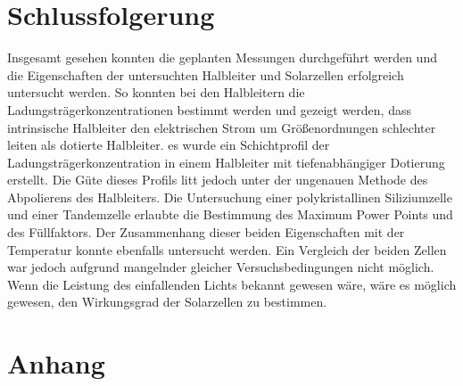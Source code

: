 \documentclass[
	a4paper,
	12pt,
	pagesize,
	ngerman
]{scrartcl}
\begin{document}
	\section{Schlussfolgerung}
	Insgesamt gesehen konnten die geplanten Messungen durchgeführt werden und die Eigenschaften der untersuchten Halbleiter und Solarzellen erfolgreich untersucht werden.
	So konnten bei den Halbleitern die Ladungsträgerkonzentrationen bestimmt werden und gezeigt werden, dass intrinsische Halbleiter den elektrischen Strom um Größenordnungen schlechter leiten als dotierte Halbleiter.
	es wurde ein Schichtprofil der Ladungsträgerkonzentration in einem Halbleiter mit tiefenabhängiger Dotierung erstellt.
	Die Güte dieses Profils litt jedoch unter der ungenauen Methode des Abpolierens des Halbleiters.
	Die Untersuchung einer polykristallinen Siliziumzelle und einer Tandemzelle erlaubte die Bestimmung des Maximum Power Points und des Füllfaktors.
	Der Zusammenhang dieser beiden Eigenschaften mit der Temperatur konnte ebenfalls untersucht werden.
	Ein Vergleich der beiden Zellen war jedoch aufgrund mangelnder gleicher Versuchsbedingungen nicht möglich.
	Wenn die Leistung des einfallenden Lichts bekannt gewesen wäre, wäre es möglich gewesen, den Wirkungsgrad der Solarzellen zu bestimmen.

	\printbibliography


	\section{Anhang} \label{s_anhang}
\end{document}
